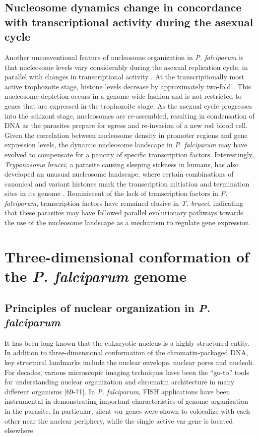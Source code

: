 \subsection{Nucleosome dynamics change in concordance with transcriptional
activity during the asexual cycle}

Another unconventional feature of nucleosome organization in \textit{P.
falciparum} is that nucleosome levels vary considerably during the asexual
replication cycle, in parallel with changes in transcriptional activity
\citep{bunnik:DNA-encoded, ponts:nucleosome}.
At the transcriptionally most active trophozoite stage, histone
levels decrease by approximately two-fold 
\citep{bunnik:DNA-encoded, ponts:nucleosome}. This nucleosome depletion
occurs in a genome-wide fashion and is not restricted to genes that are
expressed in the trophozoite stage. As the asexual cycle progresses into the
schizont stage, nucleosomes are re-assembled, resulting in condensation of DNA
as the parasites prepare for egress and re-invasion of a new red blood cell.
Given the correlation between nucleosome density in promoter regions and gene
expression levels, the dynamic nucleosome landscape in \textit{P. falciparum} may have
evolved to compensate for a paucity of specific transcription factors.
Interestingly, \textit{Trypanosoma brucei}, a parasite causing sleeping sickness in
humans, has also developed an unusual nucleosome landscape, where certain
combinations of canonical and variant histones mark the transcription
initiation and termination sites in its genome \citep{siegel:four}.
Reminiscent of the lack
of transcription factors in \textit{P. falciparum}, transcription factors have remained
elusive in \textit{T. brucei}, indicating that these parasites may have followed
parallel evolutionary pathways towards the use of the nucleosome landscape as
a mechanism to regulate gene expression.


\section{Three-dimensional conformation of the \textit{P. falciparum} genome}

\subsection{Principles of nuclear organization in \textit{P. falciparum}}

It has been long known that the eukaryotic nucleus is a highly structured
entity. In addition to three-dimensional conformation of the
chromatin-packaged DNA, key structural landmarks include the nuclear envelope,
nuclear pores and nucleoli. For decades, various microscopic imaging
techniques have been the “go-to” tools for understanding nuclear organization
and chromatin architecture in many different organisms
\citep{cremer:chromosome, misteli:beyond, takizawa:meaning}
[69-71]. In \textit{P.
falciparum}, FISH applications have been instrumental in demonstrating
important characteristics of genome organization in the parasite. In
particular, silent var genes were shown to colocalize with each other near the
nuclear periphery, while the single active var gene is located elsewhere


